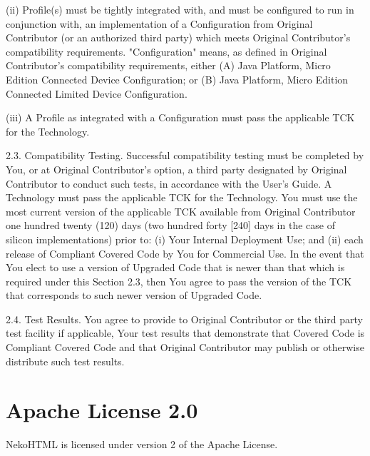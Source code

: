 {(ii) Profile(s) must be tightly integrated with, and must be
configured to run in conjunction with, an implementation of a
Configuration from Original Contributor (or an authorized third party)
which meets Original Contributor's compatibility requirements.
"Configuration" means, as defined in Original Contributor's
compatibility requirements, either (A) Java Platform, Micro Edition
Connected Device Configuration; or (B) Java Platform, Micro Edition
Connected Limited Device Configuration.

(iii) A Profile as integrated with a Configuration must pass the
applicable TCK for the Technology.

2.3.  Compatibility Testing.  Successful compatibility testing must be
completed by You, or at Original Contributor's option, a third party
designated by Original Contributor to conduct such tests, in
accordance with the User's Guide.  A Technology must pass the
applicable TCK for the Technology.  You must use the most current
version of the applicable TCK available from Original Contributor one
hundred twenty (120) days (two hundred forty [240] days in the case of
silicon implementations) prior to: (i) Your Internal Deployment Use;
and (ii) each release of Compliant Covered Code by You for Commercial
Use.  In the event that You elect to use a version of Upgraded Code
that is newer than that which is required under this Section 2.3, then
You agree to pass the version of the TCK that corresponds to such
newer version of Upgraded Code.

2.4.  Test Results.  You agree to provide to Original Contributor or
the third party test facility if applicable, Your test results that
demonstrate that Covered Code is Compliant Covered Code and that
Original Contributor may publish or otherwise distribute such test
results.
}

\section{Apache License 2.0}

\setlength{\baselineskip}{\oldbaselineskip}
\noindent
NekoHTML is licensed under version 2 of the Apache License.
\\

